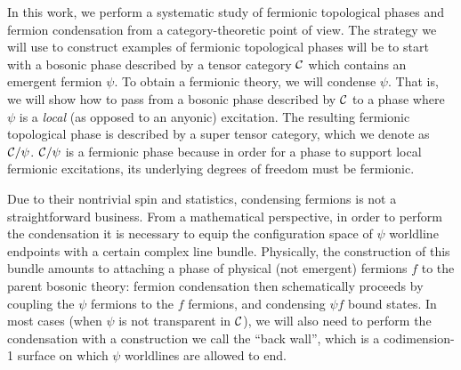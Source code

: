 In this work, we perform a systematic study of fermionic topological phases and fermion condensation from a category-theoretic point of view. 
The strategy we will use to construct examples of fermionic topological phases will be to start with 
a bosonic phase described by a tensor category $\mathcal{C}$
which contains an emergent fermion $\psi$.
To obtain a fermionic theory, we will condense $\psi$.
That is, we will show how to pass from a bosonic phase 
described by $\mathcal{C}$ to a phase where $\psi$ is a {\it local} (as opposed to an anyonic) excitation.
The resulting fermionic topological phase is described by a super tensor category, which we denote
as $\mathcal{C} / \psi$.
$\mathcal{C}/\psi$ is a fermionic phase because in order for a phase to support local fermionic excitations, 
its underlying degrees of freedom must be fermionic. 

Due to their nontrivial spin and statistics, condensing fermions is not a straightforward business. 
From a mathematical perspective, in order to perform the condensation it is necessary to equip the configuration 
space of $\psi$ worldline endpoints with a certain complex line bundle. 
Physically, the construction of this bundle amounts to attaching a phase of physical (not emergent) fermions $f$ 
to the parent bosonic theory: 
fermion condensation then schematically proceeds by coupling the $\psi$ fermions to 
the $f$ fermions, and condensing $\psi f$ bound states. 
In most cases (when $\psi$ is not transparent in $\mathcal{C}$), we will also need to perform 
the condensation with a construction we call the ``back wall'', which is a codimension-1 surface 
on which $\psi$ worldlines are allowed to end. 

